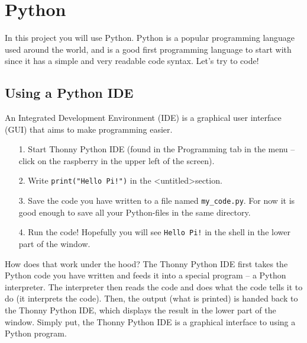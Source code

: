 \documentclass{article}
\begin{document}
\section{Python}
In this project you will use Python. Python is a popular programming language used around the world, and is a good first programming language to start with since it has a simple and very readable code syntax. Let's try to code!

\subsection{Using a Python IDE}
An Integrated Development Environment (IDE) is a graphical user interface (GUI) that aims to make programming easier.
\begin{itemize}
    \item[1.] Start Thonny Python IDE (found in the Programming tab in the menu -- click on the raspberry in the upper left of the screen).
    \item[2.] Write \texttt{print("Hello Pi!")} in the \textless untitled\textgreater  section.
    \item[3.] Save the code you have written to a file named \verb!my_code.py!. For now it is good enough to save all your Python-files in the same directory.
    \item[4.] Run the code! Hopefully you will see \texttt{Hello Pi!} in the shell in the lower part of the window.
\end{itemize}
How does that work under the hood? The Thonny Python IDE first takes the Python code you have written and feeds it into a special program -- a Python interpreter. The interpreter then reads the code and does what the code tells it to do (it interprets the code). Then, the output (what is printed) is handed back to the Thonny Python IDE, which displays the result in the lower part of the window.
Simply put, the Thonny Python IDE is a graphical interface to using a Python program.
\end{document}
